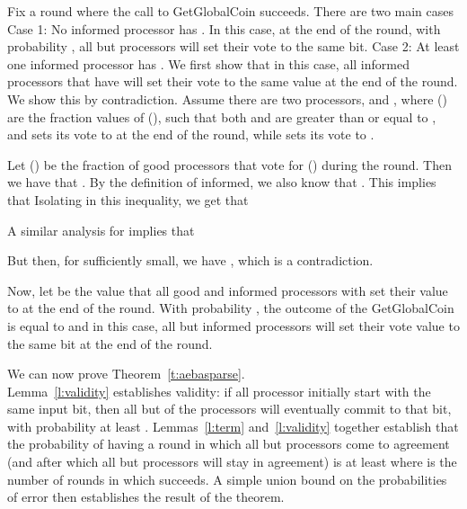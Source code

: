 \documentclass[letterpaper,11pt]{article}
\newcommand{\sq}{\hbox{\rlap{}}}
\newcommand{\qed}{\hspace*{\fill}\sq}
\newenvironment{proof}{\noindent {\bf Proof:}}{\qed\par\vskip 4mm\par}
\begin{document}
\begin{proof}
Fix a round where the call to GetGlobalCoin succeeds.  There are two main cases\\
\noindent
Case 1: No informed processor has .  In this case, at the end of the round, with probability , all but  processors will set their vote to the same bit.
\noindent
Case 2: At least one informed processor has .  We first show that in this case, all informed processors that have 
 will set their vote to the same value at the end of the round.  We show this by contradiction.  Assume there are two processors,  and , where  () are the fraction values of  (), such that both  and  are greater than or equal to , and  sets its vote to  at the end of the round, while  sets its vote to .

Let  () be the fraction of good processors that vote for  () during the round.  Then we have that .  By the definition of informed, we also know that .  This implies that
  Isolating  in this inequality, we get that


A similar analysis for  implies that


But then, for  sufficiently small, we have , which is a contradiction.  

Now, let  be the value that all good and informed processors with  set their value to at the end of the round.   With probability , the outcome of the GetGlobalCoin is equal to  and in this case, all but  informed processors will set their vote value to the same bit  at the end of the round.
\end{proof}


We can now prove Theorem~\ref{t:aebasparse}.\\
\begin{proof}
Lemma~\ref{l:validity} establishes validity: if all processor initially start with the same input bit, then all but  of the processors will eventually commit to that bit, with probability at least .  Lemmas~\ref{l:term} and~\ref{l:validity} together establish that the probability of having a round in which all but  processors come to agreement (and after which all but  processors  will stay in agreement) is at least  where  is the number of rounds in which  succeeds.  A simple union bound on the probabilities of error then establishes the result of the theorem.
\end{proof}
\end{document}

